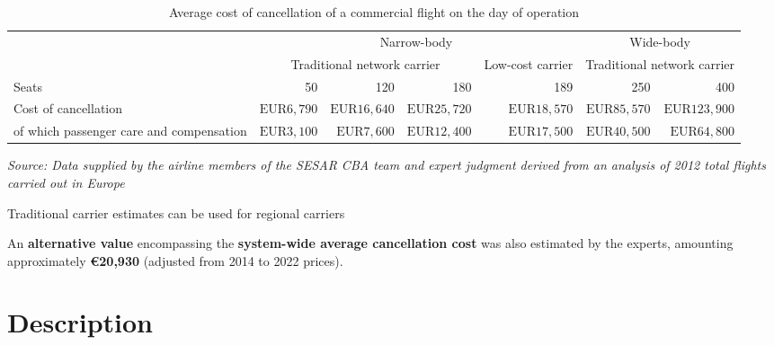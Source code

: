 \documentclass[
  11pt,
  a4paper,
]{book}
\begin{document}
\hypertarget{tbl-cancel-cost}{}
\setlength{\LTpost}{0mm}
\begin{longtable}{lrrrrrr}
\caption{\label{tbl-cancel-cost}Average cost of cancellation of a commercial flight on the day of
operation }\tabularnewline

\toprule
 & \multicolumn{4}{c}{Narrow-body} & \multicolumn{2}{c}{Wide-body} \\ 
\cmidrule(lr){2-5} \cmidrule(lr){6-7}
 & \multicolumn{3}{c}{Traditional network carrier} & Low-cost carrier & \multicolumn{2}{c}{Traditional network carrier } \\ 
\cmidrule(lr){2-4} \cmidrule(lr){5-5} \cmidrule(lr){6-7}
Seats & 50 & 120 & 180 & 189 & 250 & 400 \\ 
\midrule
Cost of cancellation & $\text{EUR}6,790$ & $\text{EUR}16,640$ & $\text{EUR}25,720$ & $\text{EUR}18,570$ & $\text{EUR}85,570$ & $\text{EUR}123,900$ \\ 
of which passenger care and compensation & $\text{EUR}3,100$ & $\text{EUR}7,600$ & $\text{EUR}12,400$ & $\text{EUR}17,500$ & $\text{EUR}40,500$ & $\text{EUR}64,800$ \\ 
\bottomrule
\end{longtable}
\begin{minipage}{\linewidth}
\emph{Source: Data supplied by the airline members of the SESAR CBA team and expert judgment derived from an analysis of 2012 total flights carried out in Europe}\\
\end{minipage}

\begin{tcolorbox}[enhanced jigsaw, opacityback=0, arc=.35mm, colframe=quarto-callout-note-color-frame, breakable, left=2mm, leftrule=.75mm, titlerule=0mm, colbacktitle=quarto-callout-note-color!10!white, rightrule=.15mm, opacitybacktitle=0.6, bottomtitle=1mm, colback=white, toptitle=1mm, title=\textcolor{quarto-callout-note-color}{\faInfo}\hspace{0.5em}{Note}, bottomrule=.15mm, toprule=.15mm, coltitle=black]

Traditional carrier estimates can be used for regional carriers

\end{tcolorbox}

An \textbf{alternative value} encompassing the \textbf{system-wide
average cancellation cost} was also estimated by the experts, amounting
approximately \textbf{€20,930} (adjusted from 2014 to 2022 prices).

\hypertarget{description-4}{%
\section{Description}\label{description-4}}
\end{document}
